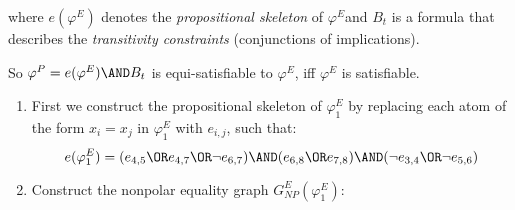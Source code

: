 {where $e(\varphi ^{E})$ denotes the \textit{propositional skeleton} of $%
\varphi ^{E}$and $B_{t}$ is a formula that describes the \textit{%
transitivity constraints} (conjunctions of implications).

So $\varphi ^{P}=e(\varphi ^{E})\AND B_{t}$ is equi-satisfiable to $\varphi
^{E}$, iff $\varphi ^{E}$ is satisfiable.

\begin{enumerate}
\item First we construct the propositional skeleton of $\varphi _{1}^{E}$ by
replacing each atom of the form $x_{i}=x_{j}$ in $\varphi _{1}^{E}$ with $%
e_{i,j}$, such that:%
\begin{equation*}
e(\varphi _{1}^{E})=(e_{4,5}\OR e_{4,7}\OR\lnot e_{6,7})\AND(e_{6,8}\OR %
e_{7,8})\AND(\lnot e_{3,4}\OR\lnot e_{5,6})
\end{equation*}

\item Construct the nonpolar equality graph $G_{NP}^{E}(\varphi _{1}^{E})$:


\end{enumerate}}
